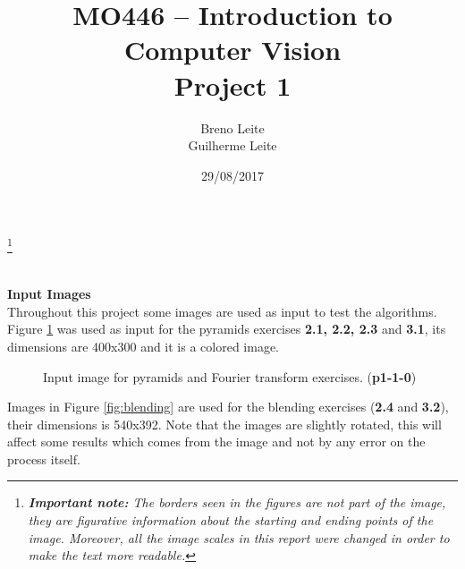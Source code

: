 \documentclass[12pt,a4paper]{article}
\title{MO446 -- Introduction to Computer Vision  \\ Project 1}
\author{Breno Leite  \\ Guilherme Leite}
\date{29/08/2017}
\newcommand\blfootnote[1]{%
	\begingroup
	\renewcommand\thefootnote{}\footnote{#1}%
	\addtocounter{footnote}{-1}%
	\endgroup
}
\begin{document}
\maketitle
\blfootnote{\textit{\textbf{Important note:} The borders seen in the figures are not part of the image, they are figurative information about the starting and ending points of the image. Moreover, all the image scales in this report were changed in order to make the text more readable.}} \\


\textbf{\LARGE Input Images}\\

Throughout this project some images are used as input to test the algorithms. Figure \ref{fig:p1-1-0} was used as input for the pyramids exercises \textbf{2.1, 2.2, 2.3} and \textbf{3.1}, its dimensions are 400x300 and it is a colored image. \\

\begin{figure}[!h]
	\centering
	{%
		\setlength{\fboxsep}{1pt}%
		\setlength{\fboxrule}{1pt}%
	}%
	\caption{Input image for pyramids and Fourier transform exercises. (\textbf{p1-1-0})}
	\label{fig:p1-1-0}
\end{figure}

\newpage

Images in Figure \ref{fig:blending} are used for the blending exercises (\textbf{2.4} and \textbf{3.2}), their dimensions is 540x392. Note that the images are slightly rotated, this will affect some results which comes from the image and not by any error on the process itself.\\
\end{document}
